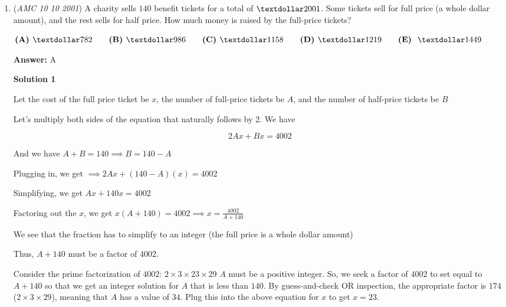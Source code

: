 \begin{enumerate}
 Testing $A$=$6$ means $D$, $E$, $F$ is $0$, $2$, $4$, respectively. However, $6$ and $8$ must then be part of $ABC$, and they already sum to more than $9$. So then we can try $A$=$8$. We have two cases: Where $DEF$ includes $0$, $2$, and $4$, or when $DEF$ includes $2$, $4$, and $6$. If we say the former, $ABC$ includes $6$ as well as $8$, which, again, has a sum over $9$. Therefore, $DEF$ must include $2$, $4$, and $6$, and leaves us with $0$, $1$, and $8$ for $ABC$. This sums to 9, and since the largest digit is $8$, $\boxed{\textbf{(E)}\ 8}$ is our answer.

 


	\item (\textit{AMC 10 10 2001}) A charity sells $140$ benefit tickets for a total of $\textdollar2001$. Some tickets sell for full price (a whole dollar amount), and the rest sells for half price. How much money is raised by the full-price tickets?


 $\textbf{(A) } \textdollar 782 \qquad \textbf{(B) } \textdollar 986 \qquad \textbf{(C) } \textdollar 1158 \qquad \textbf{(D) } \textdollar 1219 \qquad \textbf{(E) }\ \textdollar 1449$

 \textbf{Answer: }A



\textbf{Solution 1}

Let the cost of the full price ticket be $x$, the number of full-price tickets be $A$, and the number of half-price tickets be $B$

 Let's multiply both sides of the equation that naturally follows by 2. We have

 
 \[2Ax+Bx=4002\]

 And we have $A+B=140\implies B=140-A$

 Plugging in, we get $\implies 2Ax+(140-A)(x)=4002$

 Simplifying, we get $Ax+140x=4002$

 Factoring out the $x$, we get $x(A+140)=4002\implies x=\frac{4002}{A+140}$

 We see that the fraction has to simplify to an integer (the full price is a whole dollar amount)

 Thus, $A+140$ must be a factor of 4002.

 Consider the prime factorization of $4002$: $2\times3\times23\times29$
$A$ must be a positive integer. So, we seek a factor of $4002$ to set equal to $A+140$ so that we get an integer solution for $A$ that is less than $140$. By guess-and-check OR inspection, the appropriate factor is $174$ ($2\times3\times29$), meaning that $A$ has a value of $34$. Plug this into the above equation for $x$ to get $x = 23$.


\end{enumerate}
